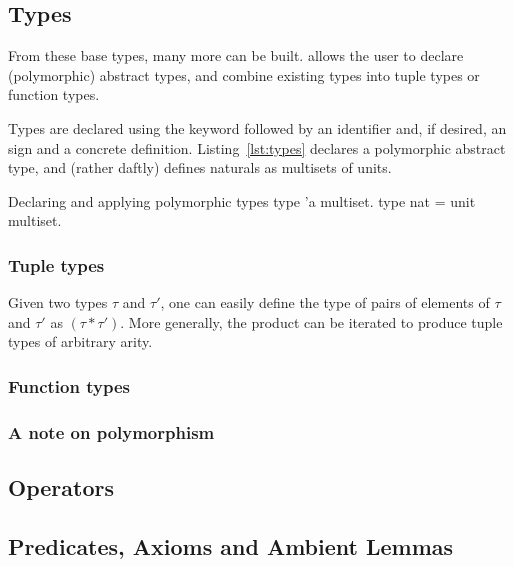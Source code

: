 \subsection{Types}
From these base types, many more can be built. \EC allows the user to declare
 (polymorphic) abstract types, and combine existing types into tuple types or
function types.

Types are declared using the  keyword followed by an identifier and,
if desired, an \rawec{=} sign and a concrete definition. Listing~\ref{lst:types}
declares a polymorphic abstract  type, and (rather daftly)
defines naturals as multisets of units.

\begin{easycrypt}[label={lst:types}]{Declaring and applying polymorphic types}
type 'a multiset.
type nat = unit multiset.
\end{easycrypt}

\subsubsection*{Tuple types}
Given two types $\tau$ and $\tau'$, one can easily define the type of pairs of
elements of $\tau$ and $\tau'$ as $\left(\tau * \tau'\right)$. More generally,
the product can be iterated to produce tuple types of arbitrary arity.


\subsubsection*{Function types}

\subsubsection*{A note on polymorphism}


\subsection{Operators}

\subsection{Predicates, Axioms and Ambient Lemmas}

